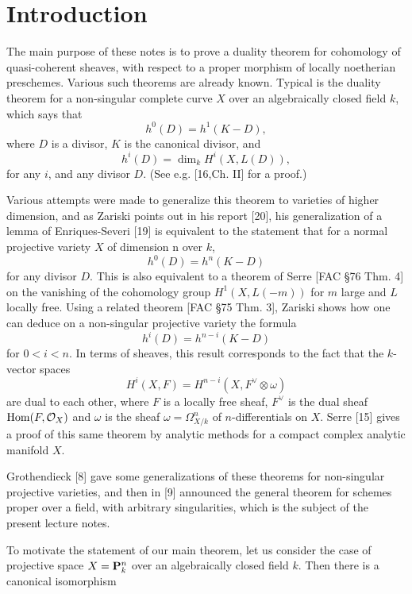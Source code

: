 \chapter*{Introduction}
The main purpose of these notes is 
to prove a duality theorem 
for cohomology of quasi-coherent sheaves, 
with respect to a proper morphism of 
locally noetherian preschemes. 
Various such theorems are already known. 
Typical is the duality theorem for 
a non-singular complete curve $X$ 
over an algebraically closed field $k$, 
which says that
\[
    h^0(D)=h^1(K-D),
\]
where $D$ is a divisor, $K$ is the canonical divisor, 
and
\[
    h^i(D)=\dim_k H^i(X, L(D)),
\]
for any $i$, and any divisor $D$. 
(See e.g. [16,Ch. II] for a proof.)

Various attempts were made to generalize this theorem 
to varieties of higher dimension, 
and as Zariski points out in his report [20], 
his generalization of a lemma of Enriques-Severi [19] 
is equivalent to the statement that
for a normal projective variety $X$ of dimension n over $k$,
\[
    h^0(D)=h^n(K-D)
\]
for any divisor $D$. 
This is also equivalent to a theorem of 
Serre [FAC §76 Thm. 4] on the vanishing 
of the cohomology group $H^1(X,L(-m))$ 
for $m$ large and $L$ locally free. 
Using a related theorem [FAC §75 Thm. 3], 
Zariski shows how one can deduce on a non-singular 
projective variety the formula
\[
    h^i(D)=h^{n-i}(K-D)
\]
for $0 < i < n$. 
In terms of sheaves, this result corresponds to the fact that 
the $k$-vector spaces
\[
    H^i(X,F)=H^{n-i}(X,F^\vee\otimes\omega)
\]
are dual to each other, where $F$ is a locally free sheaf, 
$F^\vee$ is the dual sheaf \(\mathop{\mathrm{Hom}}\nolimits(F,\mathcal{O}_X)\) 
and $\omega$ is the sheaf $\omega = \Omega_{X/k}^n$ of 
$n$-differentials on $X$. 
Serre [15] gives a proof of this same theorem 
by analytic methods for a compact complex analytic manifold $X$.

Grothendieck [8] gave some generalizations 
of these theorems for non-singular projective varieties, 
and then in [9] announced the general theorem 
for schemes proper over a field, 
with arbitrary singularities, 
which is the subject of the present lecture notes.

To motivate the statement of our main theorem, 
let us consider the case of projective 
space \(X=\mathbf{P}^n_k\) over an algebraically closed field $k$. 
Then there is a canonical isomorphism